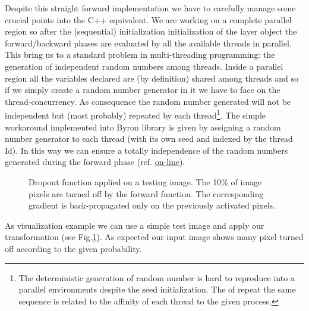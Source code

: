 \documentclass{standalone}
\begin{document}
Despite this straight forward implementation we have to carefully manage some crucial points into the C++ equivalent.
We are working on a complete parallel region so after the (sequential) initialization initialization of the layer object the forward/backward phases are evaluated by all the available threads in parallel.
This bring us to a standard problem in multi-threading programming: the generation of independent random numbers among threads.
Inside a parallel region all the variables declared are (by definition) shared among threads and so if we simply create a random number generator in it we have to face on the thread-concurrency.
As consequence the random number generated will not be independent but (most probably) repeated by each thread\footnote{
  The deterministic generation of random number is hard to reproduce into a parallel environments despite the seed initialization.
  The  of repeat the same sequence is related to the affinity of each thread to the given process.
}.
The simple workaround implemented into Byron library is given by assigning a random number generator to each thread (with its own seed and indexed by the thread Id).
In this way we can ensure a totally independence of the random numbers generated during the forward phase (ref. \href{https://github.com/Nico-Curti/Byron/blob/master/src/dropout_layer.cpp}{on-line}).

\begin{figure}[htbp]
\centering
\def\svgwidth{0.7\textwidth}

\caption{Dropout function applied on a testing image.
The 10\% of image pixels are turned off by the forward function.
The corresponding gradient is back-propagated only on the previously activated pixels.
}
\label{fig:dropout}
\end{figure}

As visualization example we can use a simple test image and apply our transformation (see Fig.\ref{fig:dropout}).
As expected our input image shows many pixel turned off according to the given probability.
\end{document}

